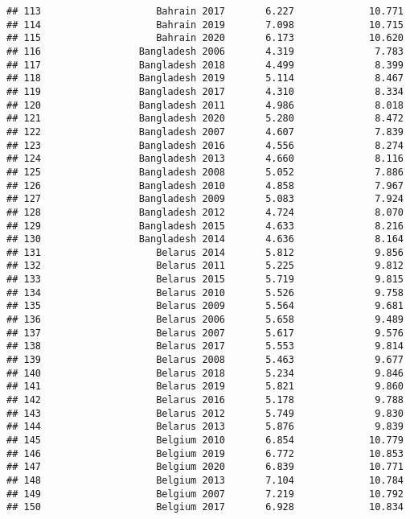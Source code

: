 \documentclass[
]{article}
\begin{document}
\begin{verbatim}
## 113                    Bahrain 2017       6.227             10.771
## 114                    Bahrain 2019       7.098             10.715
## 115                    Bahrain 2020       6.173             10.620
## 116                 Bangladesh 2006       4.319              7.783
## 117                 Bangladesh 2018       4.499              8.399
## 118                 Bangladesh 2019       5.114              8.467
## 119                 Bangladesh 2017       4.310              8.334
## 120                 Bangladesh 2011       4.986              8.018
## 121                 Bangladesh 2020       5.280              8.472
## 122                 Bangladesh 2007       4.607              7.839
## 123                 Bangladesh 2016       4.556              8.274
## 124                 Bangladesh 2013       4.660              8.116
## 125                 Bangladesh 2008       5.052              7.886
## 126                 Bangladesh 2010       4.858              7.967
## 127                 Bangladesh 2009       5.083              7.924
## 128                 Bangladesh 2012       4.724              8.070
## 129                 Bangladesh 2015       4.633              8.216
## 130                 Bangladesh 2014       4.636              8.164
## 131                    Belarus 2014       5.812              9.856
## 132                    Belarus 2011       5.225              9.812
## 133                    Belarus 2015       5.719              9.815
## 134                    Belarus 2010       5.526              9.758
## 135                    Belarus 2009       5.564              9.681
## 136                    Belarus 2006       5.658              9.489
## 137                    Belarus 2007       5.617              9.576
## 138                    Belarus 2017       5.553              9.814
## 139                    Belarus 2008       5.463              9.677
## 140                    Belarus 2018       5.234              9.846
## 141                    Belarus 2019       5.821              9.860
## 142                    Belarus 2016       5.178              9.788
## 143                    Belarus 2012       5.749              9.830
## 144                    Belarus 2013       5.876              9.839
## 145                    Belgium 2010       6.854             10.779
## 146                    Belgium 2019       6.772             10.853
## 147                    Belgium 2020       6.839             10.771
## 148                    Belgium 2013       7.104             10.784
## 149                    Belgium 2007       7.219             10.792
## 150                    Belgium 2017       6.928             10.834

\end{verbatim}
\end{document}
